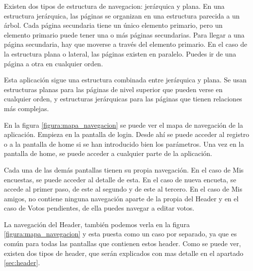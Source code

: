 \documentclass[a4paper, 12pt]{book}
\begin{document}
Existen dos tipos de estructura de navegacion: jer\'arquica y plana. En una estructura jer\'arquica,
las p\'aginas se organizan en una estructura parecida a un \'arbol. Cada p\'agina secundaria tiene un
\'unico elemento primario, pero un elemento primario puede tener una o m\'as p\'aginas secundarias.
Para llegar a una p\'agina secundaria, hay que moverse a trav\'es del elemento primario. En el caso
de la estructura plana o lateral, las p\'aginas existen en paralelo. Puedes ir de una p\'agina a otra
en cualquier orden.

Esta aplicaci\'on sigue una estructura combinada entre jer\'arquica y plana. Se usan estructuras
planas para las p\'aginas de nivel superior que pueden verse en cualquier orden, y estructuras
jer\'arquicas para las p\'aginas que tienen relaciones m\'as complejas.

En la figura \ref{figura:mapa_navegacion} se puede ver el mapa de navegaci\'on de la aplicaci\'on. Empieza en la pantalla de login. Desde ah\'i se puede acceder al registro o a la pantalla de home si se han introducido bien los par\'ametros. Una vez en la pantalla de home, se puede acceder a cualquier parte de la aplicaci\'on.

Cada una de las dem\'as pantallas tienen su propia navegaci\'on. En el caso de Mis encuestas, se puede acceder al detalle de esta. En el caso de nueva encueta, se accede al primer paso, de este al segundo y de este al tercero. En el caso de Mis amigos, no contiene ninguna navegaci\'on aparte de la propia del Header y en el caso de Votos pendientes, de ella puedes navegar a editar votos.

La navegaci\'on del Header, tambi\'en podemos verla en la figura \ref{figura:mapa_navegacion} y esta puesta como un caso por separado, ya que es com\'un para todas las pantallas que contienen estos header. Como se puede ver, existen dos tipos de header, que ser\'an explicados con mas detalle en el apartado \ref{sec:header}.
\end{document}
